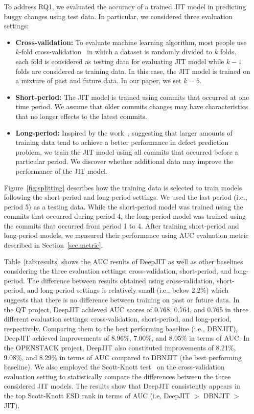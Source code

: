 To address RQ1, we evaluated the accuracy of a trained JIT model in predicting buggy changes using test data. In particular, we considered three evaluation settings: 
\begin{itemize}
\item \textbf{Cross-validation:} To evaluate machine learning algorithm, most people use $k$-fold cross-validation~\cite{kohavi1995study} in which a dataset is randomly divided to $k$ folds, each fold is considered as testing data for evaluating JIT model while $k - 1$ folds are considered as training data. In this case, the JIT model is trained on a mixture of past and future data. In our paper, we set $k = 5$.
\item \textbf{Short-period:} The JIT model is trained using commits that occurred at one time period. We assume that older commits changes may have characteristics that no longer effects to the latest commits. 
\item \textbf{Long-period:} Inspired by the work~\cite{rahman2013sample}, suggesting that larger amounts of training data tend to achieve a better performance in defect prediction problem, we train the JIT model using all commits that occurred before a particular period. We discover whether additional data may improve the performance of the JIT model. 
\end{itemize} 

Figure~\ref{fig:splitting} describes how the training data is selected to train models  following the short-period and long-period settings. We used the last period (i.e., period 5) as a testing data. While the short-period model was trained using the commits that occurred during period 4, the long-period model was trained using the commits that occurred from period 1 to 4. After training short-period and long-period models, we measured their performance using AUC evaluation metric described in Section~\ref{sec:metric}.

Table~\ref{tab:results} shows the AUC results of DeepJIT as well as other baselines considering the three evaluation settings: cross-validation, short-period, and long-period. The difference between results obtained using cross-validation, short-period, and long-period settings is relatively small (i.e., below 2.2\%) which suggests that there is no difference between training on past or future data. 
In the QT project, DeepJIT achieved AUC scores of 0.768, 0.764, and 0.765 in three different evaluation settings: cross-validation, short-period, and long-period, respectively. Comparing them to the best performing baseline (i.e., DBNJIT), DeepJIT achieved improvements of 8.96\%, 7.00\%, and 8.05\% in terms of AUC. In the OPENSTACK project, DeepJIT also constituted improvements of 8.21\%, 9.08\%, and 8.29\% in terms of AUC compared to DBNJIT (the best performing baseline). We also employed the Scott-Knott test~\cite{ghotra2015revisiting} on the cross-validation evaluation setting to statistically compare the differences between the three considered JIT models. The results show that DeepJIT consistently appears in the top Scott-Knott ESD rank in terms of AUC (i.e, DeepJIT $>$ DBNJIT $>$ JIT).  

